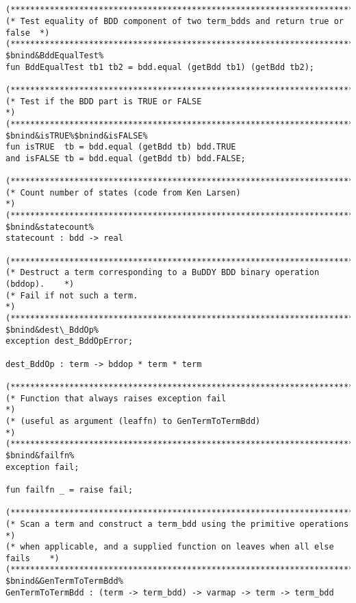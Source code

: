 \documentclass[12pt]{article}
\begin{document}
\begin{footnotesize}
\begin{Verbatim}[commandchars=\$\&\%]


(*****************************************************************************)
(* Test equality of BDD component of two term_bdds and return true or false  *)
(*****************************************************************************)
$bnind&BddEqualTest%
fun BddEqualTest tb1 tb2 = bdd.equal (getBdd tb1) (getBdd tb2);

(*****************************************************************************)
(* Test if the BDD part is TRUE or FALSE                                     *)
(*****************************************************************************)
$bnind&isTRUE%$bnind&isFALSE%
fun isTRUE  tb = bdd.equal (getBdd tb) bdd.TRUE
and isFALSE tb = bdd.equal (getBdd tb) bdd.FALSE;

(*****************************************************************************)
(* Count number of states (code from Ken Larsen)                             *)
(*****************************************************************************)
$bnind&statecount%
statecount : bdd -> real

(*****************************************************************************)
(* Destruct a term corresponding to a BuDDY BDD binary operation (bddop).    *)
(* Fail if not such a term.                                                  *)
(*****************************************************************************)
$bnind&dest\_BddOp%
exception dest_BddOpError;

dest_BddOp : term -> bddop * term * term

(*****************************************************************************)
(* Function that always raises exception fail                                *)
(* (useful as argument (leaffn) to GenTermToTermBdd)                         *)
(*****************************************************************************)
$bnind&failfn%
exception fail;

fun failfn _ = raise fail;

(*****************************************************************************)
(* Scan a term and construct a term_bdd using the primitive operations       *)
(* when applicable, and a supplied function on leaves when all else fails    *)
(*****************************************************************************)
$bnind&GenTermToTermBdd%
GenTermToTermBdd : (term -> term_bdd) -> varmap -> term -> term_bdd



\end{Verbatim}
\end{footnotesize}
\end{document}
